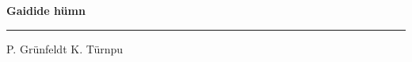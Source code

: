\documentclass[10pt]{book}
\begin{document}
{
  \samepage
  \raggedbottom
  \raggedright
  \sloppy


  \vspace{0.2in}

  \noindent\begin{minipage}{.1\textwidth}
    \hfill\vspace{0.1in}
  \end{minipage}%
  \noindent\begin{minipage}{.8\textwidth}
    \centering
    \bfseries
    \large Gaidide h\"umn
  \end{minipage}%
  \noindent\begin{minipage}{.1\textwidth}
      \hfill\vspace{0.1in}
  \end{minipage}

  \nopagebreak[4]
  \vspace{0.1in}
  \nopagebreak[4]
  \hrule height 0.05ex
  \nopagebreak[4]
  \vspace{-0.05in}

  {\footnotesize P. Gr\"unfeldt \hfill K. T\"urnpu }\\
  \vspace{0.01in}



}
\end{document}

